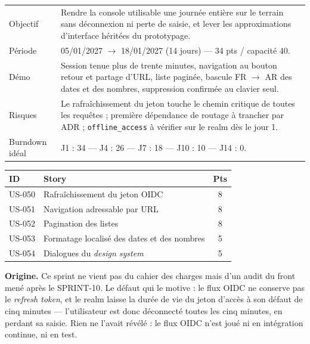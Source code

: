 \begin{center}
\begin{tabular}{lp{11cm}}
\toprule
Objectif  & Rendre la console utilisable une journée entière sur le terrain
            sans déconnexion ni perte de saisie, et lever les approximations
            d'interface héritées du prototypage. \\
Période   & 05/01/2027 $\rightarrow$ 18/01/2027 (14 jours) --- 34 pts / capacité 40. \\
Démo      & Session tenue plus de trente minutes, navigation au bouton retour et
            partage d'URL, liste paginée, bascule FR $\rightarrow$ AR des dates et
            des nombres, suppression confirmée au clavier seul. \\
Risques   & Le rafraîchissement du jeton touche le chemin critique de toutes les
            requêtes ; première dépendance de routage à trancher par ADR ;
            \texttt{offline\_access} à vérifier sur le realm dès le jour 1. \\
Burndown idéal & J1 : 34 --- J4 : 26 --- J7 : 18 --- J10 : 10 --- J14 : 0. \\
\bottomrule
\end{tabular}
\end{center}

\begin{center}
\begin{tabular}{lp{9cm}c}
\toprule
\textbf{ID} & \textbf{Story} & \textbf{Pts} \\
\midrule
US-050 & Rafraîchissement du jeton OIDC                   & 8 \\
US-051 & Navigation adressable par URL                    & 8 \\
US-052 & Pagination des listes                            & 8 \\
US-053 & Formatage localisé des dates et des nombres      & 5 \\
US-054 & Dialogues du \emph{design system}                & 5 \\
\bottomrule
\end{tabular}
\end{center}

\textbf{Origine.} Ce sprint ne vient pas du cahier des charges mais d'un audit
du front mené après le SPRINT-10. Le défaut qui le motive : le flux OIDC ne
conserve pas le \emph{refresh token}, et le realm laisse la durée de vie du
jeton d'accès à son défaut de cinq minutes --- l'utilisateur est donc déconnecté
toutes les cinq minutes, en perdant sa saisie. Rien ne l'avait révélé : le flux
OIDC n'est joué ni en intégration continue, ni en test.

